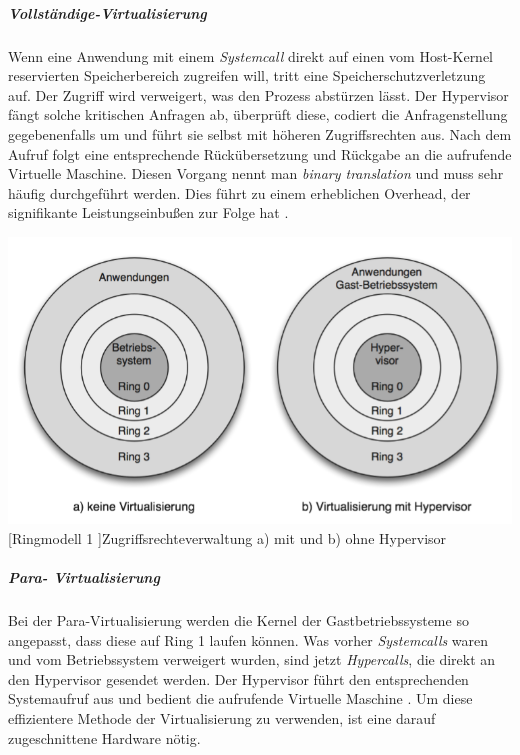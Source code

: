 \subparagraph{Vollständige-Virtualisierung}
 Wenn eine Anwendung mit einem \emph{Systemcall} direkt auf einen vom Host-Kernel reservierten Speicherbereich zugreifen will, tritt eine Speicherschutzverletzung auf. Der Zugriff wird verweigert, was den Prozess abstürzen lässt. Der Hypervisor fängt solche kritischen Anfragen ab, überprüft diese, codiert die Anfragenstellung gegebenenfalls um und führt sie selbst mit höheren Zugriffsrechten aus. Nach dem Aufruf folgt eine entsprechende Rückübersetzung und Rückgabe an die aufrufende Virtuelle Maschine. Diesen Vorgang nennt man \emph{binary translation} und muss sehr häufig durchgeführt werden. Dies führt zu einem erheblichen Overhead, der signifikante Leistungseinbußen zur Folge hat \cite{Meinel2011VirtualisierungMarktubersicht}. 
 
 \vspace{1em}
\begin{minipage}{\linewidth}
	\centering
	\includegraphics[width=1\linewidth]{pics/Ringmodell1.PNG}
	[Ringmodell 1 ]{Zugriffsrechteverwaltung a) mit und b) ohne Hypervisor \cite{Meinel2011VirtualisierungMarktubersicht} }
	\label{fig:Ringmodell1}
\end{minipage}
 
 \subparagraph{Para- Virtualisierung}
 Bei der Para-Virtualisierung werden die Kernel der Gastbetriebssysteme so angepasst, dass diese auf Ring 1 laufen können. Was vorher \emph{Systemcalls} waren und vom Betriebssystem verweigert wurden, sind jetzt \emph{Hypercalls}, die direkt an den Hypervisor gesendet werden. Der Hypervisor führt den entsprechenden Systemaufruf aus und bedient die aufrufende Virtuelle Maschine \cite{Meinel2011VirtualisierungMarktubersicht}. Um diese effizientere Methode der Virtualisierung zu verwenden, ist eine darauf zugeschnittene Hardware nötig.

